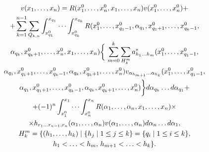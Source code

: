 \begin{gather}


v(x_{1},\dotsc ,x_{n})=R(x_{1}^{0},\dotsc ,x_{n}^{0},x_{1},\dotsc ,x_{n})


v(x_{1}^{0},\dotsc ,x_{n}^{0})+\notag \\


%


+\sum_{k=1}^{n-1} \sum_{Q_{k,n}} \int_{x_{q_{1}}^{0}}^{x_{q_{1}}}\dotsb


\int_{x_{q_{k}}^{0}}^{x_{q_{k}}} R(x_{1}^{0},\dotsc ,x_{q_{1}-1}^{0},


\alpha_{q_{1}},x_{q_{1}+1}^{0},\dotsc ,x_{q_{k}-1}^{0},\notag\\


%


\alpha_{q_{k}},x_{q_{k}+1}^{0},\dotsc ,x_{n}^{0},


x_{1},\dotsc ,x_{n})\bigg\{\, \sum_{m=0}^{k} \sum_{H_{k}^{m}}


a_{h_{1}\dotsc h_{m}}^{*} (x_{1}^{0},\dotsc ,x_{q_{1}-1}^{0},\notag \\


%


\alpha_{q_{1}},x_{q_{1}+1}^{0},\dotsc ,x_{q_{k}-1}^{0},


\alpha_{q_{k}},x_{q_{k}+1}^{0},


\dotsc ,x_{n}^{0})v_{\alpha_{h_{m+1}}\dotsc \alpha_{h_{k}}} (x_{1}^{0},\dotsc


,x_{q_{1}-1}^{0}, \\


%


\alpha_{q_{1}},x_{q_{1}+1}^{0},\dotsc ,x_{q_{k}-1}^{0},\alpha_{q_{k}},


x_{q_{k}+1}^{0},\dotsc ,x_{n}^{0}) \bigg\} d\alpha_{q_{k}}


\dotsc d\alpha_{q_{1}}+ \notag \\


%


+(-1)^{n} \int_{x_{1}^{0}}^{x_{1}}\dotsb \int_{x_{n}^{0}}^{x_{n}}


R(\alpha_{1},\dotsc ,\alpha_{n},x_{1},\dotsc ,x_{n})\times \notag \\


\times h_{r_{1}\dotsc r_{n-1},r_{n}}(\alpha_{1},\dotsc ,\alpha_{n})


v(\alpha_{1},\dotsc ,\alpha_{n})d\alpha_{n}\dotsc d\alpha_{1},\notag\\


H_{k}^{m}=\{(h_{1},\dotsc


,h_{k})\mid \{h_{j}\mid 1\leq j\leq k\}=\{q_{i}\mid 1\leq i \leq k\},\notag\\


h_{1}<\dotsc <h_{m},\, h_{m+1}<\dotsc<h_{k}\}.\notag


\end{gather}


